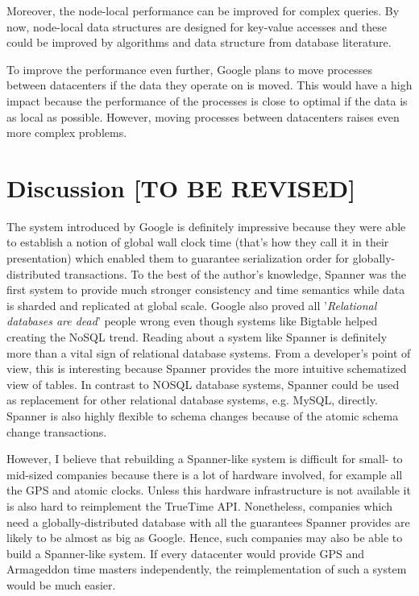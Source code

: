 \documentclass[onecolumn, a4paper, 10pt]{article}
\newcommand{\tbr}{{\color{red}\textbf{[TO BE REVISED]}}}
\begin{document}
Moreover, the node-local performance can be improved for complex queries. By now,
node-local data structures are designed for key-value accesses and these could be
improved by algorithms and data structure from database literature.

To improve the performance even further, Google plans to move processes between
datacenters if the data they operate on is moved. This would have a high impact
because the performance of the processes is close to optimal if the data is as
local as possible. However, moving processes between datacenters raises even more
complex problems.

\section{Discussion \tbr}
\label{sec:discussion}

The system introduced by Google is definitely impressive because they were able
to establish a notion of global wall clock time (that's how they call it in their
presentation) which enabled them to guarantee serialization order for
globally-distributed transactions. To the best of the author's knowledge, Spanner
was the first system to provide much stronger consistency and time semantics while
data is sharded and replicated at global scale. Google also proved all
'\emph{Relational databases are dead}' people wrong even though systems like
Bigtable helped creating the NoSQL trend. Reading about a system like Spanner is
definitely more than a vital sign of relational database systems. From a
developer's point of view, this is interesting because Spanner provides
the more intuitive schematized view of tables. In contrast to NOSQL database
systems, Spanner could be used as replacement for other relational database
systems, e.g. MySQL, directly. Spanner is also highly flexible to schema changes
because of the atomic schema change transactions.

However, I believe that rebuilding a Spanner-like system is difficult for
small- to mid-sized companies because there is a lot of hardware involved, for
example all the GPS and atomic clocks. Unless this hardware infrastructure is
not available it is also hard to reimplement the TrueTime API. Nonetheless,
companies which need a globally-distributed database with all the guarantees
Spanner provides are likely to be almost as big as Google. Hence, such companies
may also be able to build a Spanner-like system. If every datacenter would provide
GPS and Armageddon time masters independently, the reimplementation of such a
system would be much easier.
\end{document}
